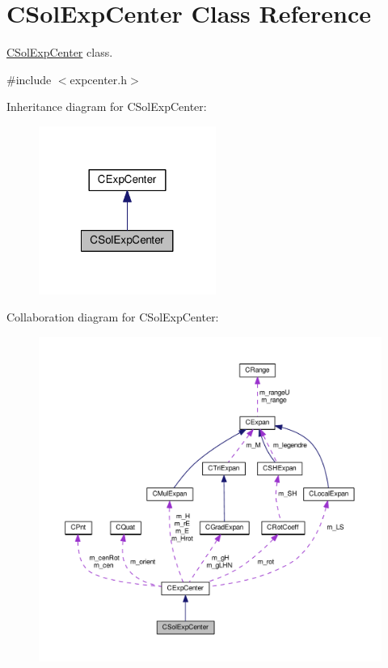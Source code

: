 \hypertarget{classCSolExpCenter}{\section{C\-Sol\-Exp\-Center Class Reference}
\label{classCSolExpCenter}
}


\hyperlink{classCSolExpCenter}{C\-Sol\-Exp\-Center} class.  




{\ttfamily \#include $<$expcenter.\-h$>$}



Inheritance diagram for C\-Sol\-Exp\-Center\-:\nopagebreak
\begin{figure}[H]
\begin{center}
\leavevmode
\includegraphics[width=164pt]{classCSolExpCenter__inherit__graph}
\end{center}
\end{figure}


Collaboration diagram for C\-Sol\-Exp\-Center\-:\nopagebreak
\begin{figure}[H]
\begin{center}
\leavevmode
\includegraphics[width=350pt]{classCSolExpCenter__coll__graph}
\end{center}
\end{figure}
